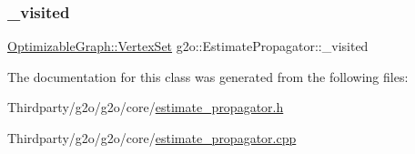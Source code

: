 \mbox{\label{classg2o_1_1_estimate_propagator_a1256927d6d1832ee300daa53d1c845a2}} 
\subsubsection{\texorpdfstring{\+\_\+visited}{\_visited}}
{\footnotesize\ttfamily \mbox{\hyperlink{classg2o_1_1_hyper_graph_a703938cdb4bb636860eed55a2489d70c}{Optimizable\+Graph\+::\+Vertex\+Set}} g2o\+::\+Estimate\+Propagator\+::\+\_\+visited\hspace{0.3cm}{\ttfamily [protected]}}



The documentation for this class was generated from the following files\+:\begin{DoxyCompactItemize}
\item 
Thirdparty/g2o/g2o/core/\mbox{\hyperlink{estimate__propagator_8h}{estimate\+\_\+propagator.\+h}}\item 
Thirdparty/g2o/g2o/core/\mbox{\hyperlink{estimate__propagator_8cpp}{estimate\+\_\+propagator.\+cpp}}\end{DoxyCompactItemize}

